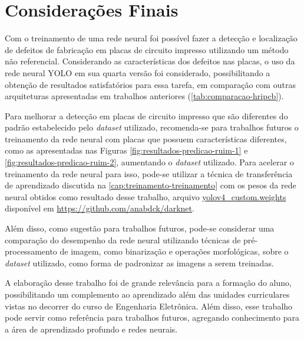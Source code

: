 \chapter{Considerações Finais}
Com o treinamento de uma rede neural foi possível fazer a detecção e localização de defeitos de fabricação em placas de circuito impresso utilizando um método não referencial. Considerando as características dos defeitos nas placas, o uso da rede neural YOLO em sua quarta versão foi considerado, possibilitando a obtenção de resultados satisfatórios para essa tarefa, em comparação com outras arquiteturas apresentadas em trabalhos anteriores (\autoref{tab:comparacao-hripcb}).

Para melhorar a detecção em placas de circuito impresso que são diferentes do padrão estabelecido pelo \textit{dataset} utilizado, recomenda-se para trabalhos futuros o treinamento da rede neural com placas que possuem características diferentes, como as apresentadas nas Figuras \ref{fig:resultados-predicao-ruim-1} e \ref{fig:resultados-predicao-ruim-2}, aumentando o \textit{dataset} utilizado.  Para acelerar o treinamento da rede neural para isso, pode-se utilizar a técnica de transferência de aprendizado discutida na \autoref{cap:treinamento-treinamento} com os pesos da rede neural obtidos como resultado desse trabalho, arquivo \url{yolov4_custom.weights} disponível em \url{https://github.com/anabdck/darknet}.

Além disso, como sugestão para trabalhos futuros, pode-se considerar uma comparação do desempenho da rede neural utilizando técnicas de pré-processamento de imagem, como binarização e operações morfológicas, sobre o \textit{dataset} utilizado, como forma de padronizar as imagens a serem treinadas.

A elaboração desse trabalho foi de grande relevância para a formação do aluno, possibilitando um complemento ao aprendizado além das unidades curriculares vistas no decorrer do curso de Engenharia Eletrônica. Além disso, esse trabalho pode servir como referência para trabalhos futuros, agregando conhecimento para a área de aprendizado profundo e redes neurais.
